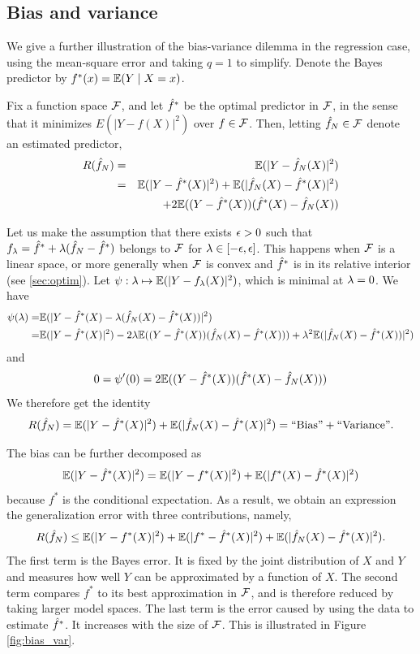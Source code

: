 \subsection{Bias and variance}
We give a further illustration of the bias-variance dilemma in the regression case, using the mean-square error and taking $q=1$ to simplify. Denote the Bayes predictor by $f^*(x) = \bm{\mathbb E}(Y\mid X=x)$.

Fix a function space ${\mathcal F}$, and let ${\hat{f}}^{*}$ be the optimal predictor in ${\mathcal F}$, in the sense that it minimizes $E(|Y- f(X)|^{2})$ over $f\in {\mathcal F}$. Then, letting ${\hat{f}}_N\in \mathcal F$ denote an estimated predictor,
\begin{eqnarray*}
R({\hat{f}}_N) &=& \bm{\mathbb E}(|Y- {\hat{f}}_N(X)|^2) \\
&=& \bm{\mathbb E}(|Y- {\hat{f}}^*(X)|^2) + \bm{\mathbb E}(|{\hat{f}}_N(X) - {\hat{f}}^*(X)|^2) \\
&&+
2\bm{\mathbb E}((Y-{\hat{f}}^*(X))({\hat{f}}^*(X) - {\hat{f}}_N(X))
\end{eqnarray*}

Let us make the assumption that there exists $\epsilon>0$ such that $f_{\lambda} = {\hat{f}}^{*} + \lambda({\hat{f}}_{N} - {\hat{f}}^{*})$ belongs to ${\mathcal F}$ for  $\lambda \in [-\epsilon,\epsilon]$. This happens when ${\mathcal F}$ is  a linear space, or more generally when ${\mathcal F}$ is convex and ${\hat{f}}^*$ is in its relative interior (see \cref{sec:optim}). Let $\psi: \lambda \mapsto \bm{\mathbb E}(|Y- f_\lambda(X)|^2)$, which is minimal at $\lambda =0$.  We have
 \begin{align*}
 \psi(\lambda) = &  \bm{\mathbb E}(|Y- {\hat{f}}^{*}(X) - \lambda({\hat{f}}_{N}(X) - {\hat{f}}^{*}(X)) |^2)\\
  = &  \bm{\mathbb E}(|Y- {\hat{f}}^{*}(X)|^2)  - 2\lambda \bm{\mathbb E}((Y- {\hat{f}}^{*}(X))({\hat{f}}_{N}(X) - {\hat{f}}^{*}(X)) ) + \lambda^2 \bm{\mathbb E}(|{\hat{f}}_{N}(X) - {\hat{f}}^{*}(X)) |^2)
  \end{align*}
and
\[
0 = \psi'(0) = 2\bm{\mathbb E}((Y-{\hat{f}}^*(X))({\hat{f}}^*(X) - {\hat{f}}_{N}(X)))
\]
 We therefore get the identity
\[
R({\hat{f}}_N) =  \bm{\mathbb E}(|Y- {\hat{f}}^*(X)|^2) + \bm{\mathbb E}(|{\hat{f}}_N(X) - {\hat{f}}^*(X)|^2) = \text{``Bias''} + \text{``Variance''}.
\]


The bias can be further decomposed as 
\[
\bm{\mathbb E}(|Y- {\hat{f}}^*(X)|^2) = \bm{\mathbb E}(|Y- f^*(X)|^2) + \bm{\mathbb E}(|f^{*}(X) - {\hat{f}}^*(X)|^2)
\]
because $f^*$ is the conditional expectation.
 As a result, we obtain an expression the generalization error with three contributions, namely,
\[
R({\hat{f}}_N) \leq \bm{\mathbb E}(|Y- f^*(X)|^2) + \bm{\mathbb E}(|f^{*}- {\hat{f}}^*(X)|^2) + \bm{\mathbb E}(|{\hat{f}}_N(X) - {\hat{f}}^*(X)|^2).
\]
The first term is the Bayes error. It is fixed by the joint distribution of $X$ and $Y$ and measures how well $Y$ can be approximated by a function of $X$. The second term compares $f^{*}$ to its best approximation in ${\mathcal F}$, and is therefore reduced by taking larger model spaces. The last term is the
error caused by using the data to estimate ${\hat{f}}^*$. It increases with the size of ${\mathcal F}$. This is illustrated in Figure \ref{fig:bias_var}.

